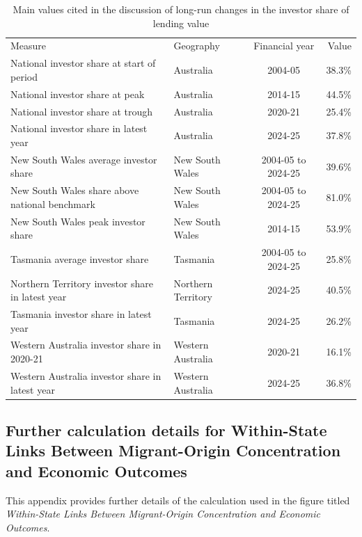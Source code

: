 \documentclass[
  11pt,
  a4paper,
]{article}
\begin{document}
\begin{longtable}[t]{>{\raggedright\arraybackslash}p{6cm}lcr}

\caption{\label{tbl-app-q1-investor-values}Main values cited in the
discussion of long-run changes in the investor share of lending value}

\tabularnewline

\\
\toprule
Measure & Geography & Financial year & Value\\
\midrule
National investor share at start of period & Australia & 2004-05 & 38.3\%\\
National investor share at peak & Australia & 2014-15 & 44.5\%\\
National investor share at trough & Australia & 2020-21 & 25.4\%\\
National investor share in latest year & Australia & 2024-25 & 37.8\%\\
New South Wales average investor share & New South Wales & 2004-05 to 2024-25 & 39.6\%\\
\addlinespace
New South Wales share above national benchmark & New South Wales & 2004-05 to 2024-25 & 81.0\%\\
New South Wales peak investor share & New South Wales & 2014-15 & 53.9\%\\
Tasmania average investor share & Tasmania & 2004-05 to 2024-25 & 25.8\%\\
Northern Territory investor share in latest year & Northern Territory & 2024-25 & 40.5\%\\
Tasmania investor share in latest year & Tasmania & 2024-25 & 26.2\%\\
\addlinespace
Western Australia investor share in 2020-21 & Western Australia & 2020-21 & 16.1\%\\
Western Australia investor share in latest year & Western Australia & 2024-25 & 36.8\%\\
\bottomrule

\end{longtable}

\subsection{Further calculation details for Within-State Links Between
Migrant-Origin Concentration and Economic
Outcomes}\label{further-calculation-details-for-within-state-links-between-migrant-origin-concentration-and-economic-outcomes}

This appendix provides further details of the calculation used in the
figure titled \emph{Within-State Links Between Migrant-Origin
Concentration and Economic Outcomes}.
\end{document}

